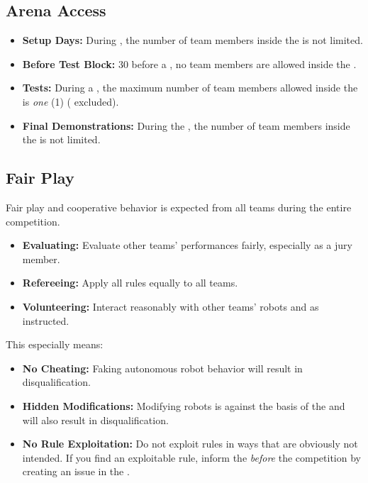 \subsection{Arena Access}
\label{sec:rules:arenaaccess}
\begin{itemize}
	\item \textbf{Setup Days:} During \SetupDays{}, the number of team members inside the \Arena{} is not limited.
	\item \textbf{Before Test Block:} \SI{30}{\min} before a \Testblock{}, no team members are allowed inside the \Arena{}.
	\item \textbf{Tests:} During a \Testslot{}, the maximum number of team members allowed inside the \Arena{} is \emph{one} (1) (\Volunteers{} excluded).
	\item \textbf{Final Demonstrations:} During the \FINAL{}, the number of team members inside the \Arena{} is not limited.
\end{itemize}


\subsection{Fair Play}
\label{sec:rules:fairplay}
Fair play and cooperative behavior is expected from all teams during the entire competition.
\begin{itemize}
	\item \textbf{Evaluating:} Evaluate other teams' performances fairly, especially as a jury member.
	\item \textbf{Refereeing:} Apply all rules equally to all teams.
	\item \textbf{Volunteering:} Interact reasonably with other teams' robots and as instructed.
\end{itemize}
This especially means:
\begin{itemize}
	\item \textbf{No Cheating:} Faking autonomous robot behavior will result in disqualification.
	\item \textbf{Hidden Modifications:} Modifying robots is against the basis of the \SPLs{} and will also result in disqualification.
	\item \textbf{No Rule Exploitation:} Do not exploit rules in ways that are obviously not intended. If you find an exploitable rule, inform the \TC{} \emph{before} the competition by creating an issue in the \AtHome{} \RR{}.
\end{itemize}


